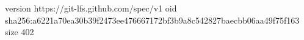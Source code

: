 version https://git-lfs.github.com/spec/v1
oid sha256:a6221a70ea30b39f2473ee476667172bf3b9a8c542827baecbb06aa49f75f163
size 402
